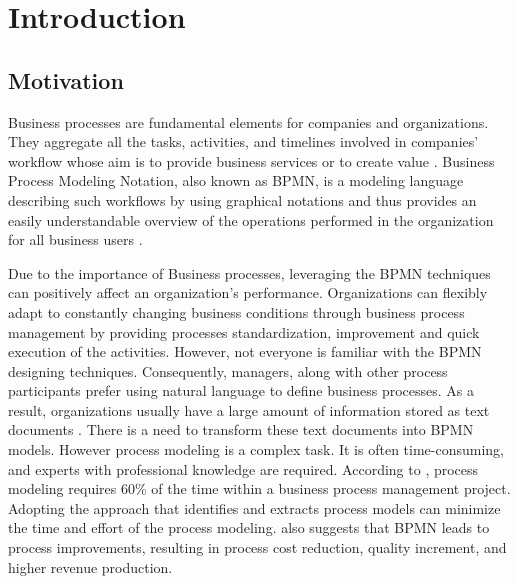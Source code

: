 \chapter{Introduction}
\label{sec:intro}

\section{Motivation}
\label{sec:intro:mo}


	Business processes are fundamental elements for companies and organizations. They aggregate all the tasks, activities, and timelines involved in companies' workflow whose aim is to provide business services or to create value \cite{literature_review_2}. Business Process Modeling Notation, also known as BPMN, is a modeling language describing such workflows by using graphical notations and thus provides an easily understandable overview of the operations performed in the organization for all business users \cite{literature_review_1}. 
	
	Due to the importance of Business processes, leveraging the BPMN techniques can positively affect an organization's performance. Organizations can flexibly adapt to constantly changing business conditions through business process management by providing processes standardization, improvement and quick execution of the activities. \cite{t2m_5} However, not everyone is familiar with the BPMN designing techniques. Consequently, managers, along with other process participants prefer using natural language to define business processes. As a result, organizations usually have a large amount of information stored as text documents \cite{literature_review_2}. There is a need to transform these text documents into BPMN models. However process modeling is a complex task. It is often time-consuming, and experts with professional knowledge are required. According to \cite{t2m_5}, process modeling requires 60\% of the time within a business process management project. Adopting the approach that identifies and extracts process models can minimize the time and effort of the process modeling. \cite{literature_review_3} also suggests that  BPMN leads to process improvements, resulting in process cost reduction, quality increment, and higher revenue production. 
	
